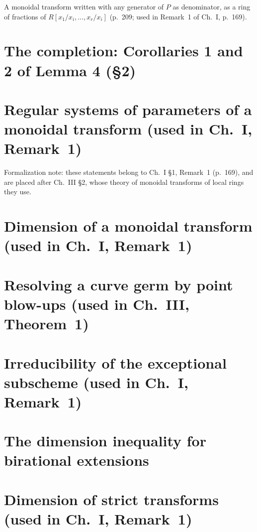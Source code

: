 A monoidal transform written with any generator of $P$ as denominator, as a ring of fractions of
$R[x_1/x_i,\dots,x_r/x_i]$ (p.~209; used in Remark~1 of Ch.~I, p.~169).

\section{The completion: Corollaries 1 and 2 of Lemma 4 (\S2)}

\section{Regular systems of parameters of a monoidal transform (used in Ch.~I, Remark~1)}
Formalization note: these statements belong to Ch.~I \S1, Remark~1 (p.~169), and are placed
after Ch.~III \S2, whose theory of monoidal transforms of local rings they use.

\section{Dimension of a monoidal transform (used in Ch.~I, Remark~1)}

\section{Resolving a curve germ by point blow-ups (used in Ch.~III, Theorem~1)}

\section{Irreducibility of the exceptional subscheme (used in Ch.~I, Remark~1)}

\section{The dimension inequality for birational extensions}

\section{Dimension of strict transforms (used in Ch.~I, Remark~1)}

